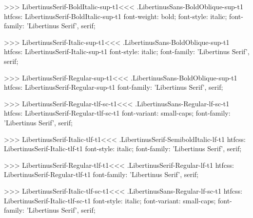 {{{{>>>
\<LibertinusSerif-BoldItalic-sup-t1\><<<
.LibertinusSans-BoldOblique-sup-t1
htfcss:  LibertinusSerif-BoldItalic-sup-t1  font-weight: bold; font-style: italic; font-family: 'Libertinus Serif', serif;

>>>
\<LibertinusSerif-Italic-sup-t1\><<<
.LibertinusSans-BoldOblique-sup-t1
htfcss:  LibertinusSerif-Italic-sup-t1  font-style: italic; font-family: 'Libertinus Serif', serif;

>>>
\<LibertinusSerif-Regular-sup-t1\><<<
.LibertinusSans-BoldOblique-sup-t1
htfcss:  LibertinusSerif-Regular-sup-t1  font-family: 'Libertinus Serif', serif;

>>>
\<LibertinusSerif-Regular-tlf-sc-t1\><<<
.LibertinusSans-Regular-lf-sc-t1
htfcss:  LibertinusSerif-Regular-tlf-sc-t1  font-variant: small-caps; font-family: 'Libertinus Serif', serif;

>>>
\<LibertinusSerif-Italic-tlf-t1\><<<
.LibertinusSerif-SemiboldItalic-lf-t1
htfcss:  LibertinusSerif-Italic-tlf-t1  font-style: italic; font-family: 'Libertinus Serif', serif;

>>>
\<LibertinusSerif-Regular-tlf-t1\><<<
.LibertinusSerif-Regular-lf-t1
htfcss:  LibertinusSerif-Regular-tlf-t1  font-family: 'Libertinus Serif', serif;

>>>
\<LibertinusSerif-Italic-tlf-sc-t1\><<<
.LibertinusSans-Regular-lf-sc-t1
htfcss:  LibertinusSerif-Italic-tlf-sc-t1  font-style: italic; font-variant: small-caps; font-family: 'Libertinus Serif', serif;

}}}}
